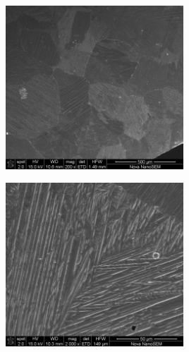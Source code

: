 \documentclass[usenames,dvipsnames]{beamer}
\begin{document}
% 
% 







\begin{frame}

\begin{multicols}{2}

\includegraphics[width=0.5\textwidth]{img/tamgrano/L1B1_016.jpg}

\includegraphics[width=0.5\textwidth]{img/tamgrano/L1B1_014.jpg}
 
\end{multicols}
\end{frame}

\end{document}
